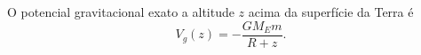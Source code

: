 O potencial gravitacional exato a altitude $z$ acima da superfície da Terra é
\[
V_g(z)=-\frac{GM_E m}{R+z}.
\]